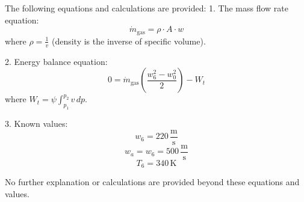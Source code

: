 The following equations and calculations are provided:  
1. The mass flow rate equation:  
\[
\dot{m}_{\text{gas}} = \rho \cdot A \cdot w
\]  
where \( \rho = \frac{1}{v} \) (density is the inverse of specific volume).  

2. Energy balance equation:  
\[
0 = \dot{m}_{\text{gas}} \left( \frac{w_6^2 - w_0^2}{2} \right) - W_t
\]  
where \( W_t = \psi \int_{p_1}^{p_2} v \, dp \).  

3. Known values:  
\[
w_6 = 220 \, \frac{\text{m}}{\text{s}}
\]  
\[
w_a = w_6 = 500 \, \frac{\text{m}}{\text{s}}
\]  
\[
T_6 = 340 \, \text{K}
\]  

No further explanation or calculations are provided beyond these equations and values.